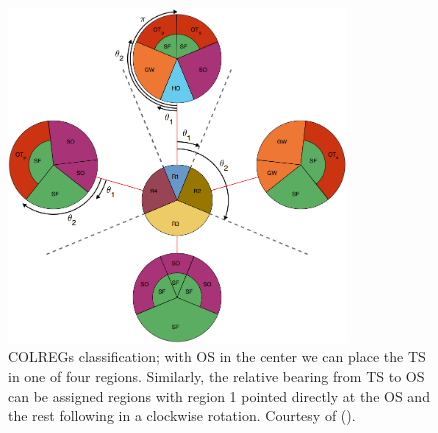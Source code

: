 \begin{figure}[t!]
    \centering
    \includegraphics[width=0.8\textwidth]{Images/COLREGs_assess2.png}
    \caption{COLREGs classification; with OS in the center we can place the TS in one of four regions. Similarly, the relative bearing from TS to OS can be assigned regions with region 1 pointed directly at the OS and the rest following in a clockwise rotation.
    Courtesy of (\cite{Thyri2021b}).}
    \label{FIG: COLREGs Classification}
\end{figure}

